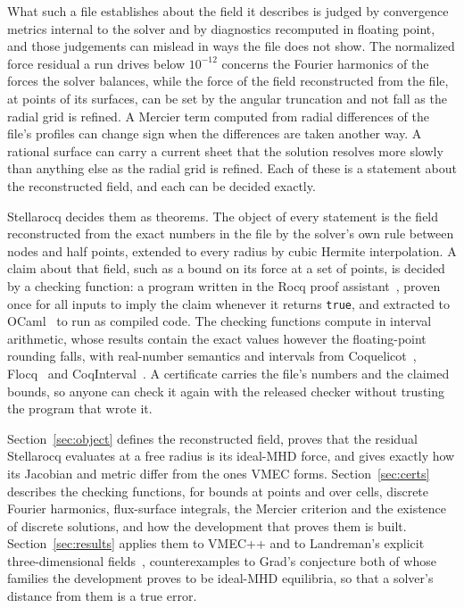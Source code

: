 \documentclass[11pt]{article}
\newcommand{\code}[1]{\texttt{#1}}
\begin{document}
What such a file establishes about the field it describes is judged by
convergence metrics internal to the solver and by diagnostics recomputed in
floating point, and those judgements can mislead in ways the file does not
show. The normalized force residual a run drives below $10^{-12}$ concerns the
Fourier harmonics of the forces the solver balances, while the force of the
field reconstructed from the file, at points of its surfaces, can be set by the
angular truncation and not fall as the radial grid is refined. A Mercier term
computed from radial differences of the file's profiles can change sign when
the differences are taken another way. A rational surface can carry a current
sheet that the solution resolves more slowly than anything else as the radial
grid is refined. Each of these is a statement about the reconstructed field,
and each can be decided exactly.

Stellarocq decides them as theorems. The object of every statement is the field
reconstructed from the exact numbers in the file by the solver's own rule
between nodes and half points, extended to every radius by cubic Hermite
interpolation. A claim about that field, such as a
bound on its force at a set of points, is decided by a checking function: a
program written in the Rocq proof assistant~\cite{rocq}, proven once for all
inputs to imply the claim whenever it returns \code{true}, and extracted to
OCaml~\cite{letouzey2003} to run as compiled code. The checking functions
compute in interval arithmetic, whose results contain the exact values however
the floating-point rounding falls, with real-number semantics and intervals
from Coquelicot~\cite{coquelicot}, Flocq~\cite{flocq} and
CoqInterval~\cite{melquiond2008}. A certificate carries the file's numbers and
the claimed bounds, so anyone can check it again with the released checker
without trusting the program that wrote it.

Section~\ref{sec:object} defines the reconstructed field, proves that the
residual Stellarocq evaluates at a free radius is its ideal-MHD force, and gives
exactly how its
Jacobian and metric differ from the ones VMEC forms. Section~\ref{sec:certs}
describes the checking functions, for bounds at points and over cells, discrete
Fourier harmonics, flux-surface integrals, the Mercier criterion and the
existence of discrete solutions, and how the development that proves them is
built. Section~\ref{sec:results} applies them to VMEC++ and to Landreman's
explicit three-dimensional fields~\cite{landreman2026}, counterexamples to
Grad's conjecture both of whose families the development proves to be ideal-MHD
equilibria, so that a solver's distance from them is a true error.
\end{document}

